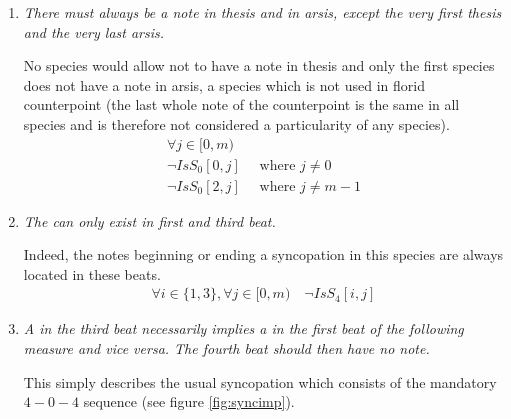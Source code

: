 \begin{enumerate}[wide, label=\bfseries 5.R\arabic*]
    \item  \label{rhythm:taexist} \textit{There must always be a note in thesis and in arsis, except the very first thesis and the very last arsis.}
    
    No species would allow not to have a note in thesis and only the first species does not have a note in arsis, a species which is not used in florid counterpoint (the last whole note of the counterpoint is the same in all species and is therefore not considered a particularity of any species).
    \begin{equation}
        \begin{gathered}
            \forall j \in [0, m)\\
            \lnot IsS_{0}[0, j]\quad \text{ where } j \neq 0\\
            \lnot IsS_{0}[2, j]\quad \text{ where } j \neq m-1
        \end{gathered}
    \end{equation}

    \item \label{rhythm:no4in2and4} \textit{The  can only exist in first and third beat.}
    
    Indeed, the notes beginning or ending a syncopation in this species are always located in these beats.
    \begin{equation}
        \begin{gathered}
            \forall i \in \{1, 3\}, \forall j \in [0, m)\quad
            \lnot IsS_{4}[i, j]
        \end{gathered}
    \end{equation}

    \item \label{rhythm:404} \textit{A  in the third beat necessarily implies a  in the first beat of the following measure and vice versa. The fourth beat should then have no note.}
    
    This simply describes the usual syncopation which consists of the mandatory $4-0-4$ sequence (see figure \ref{fig:syncimp}).


\end{enumerate}
